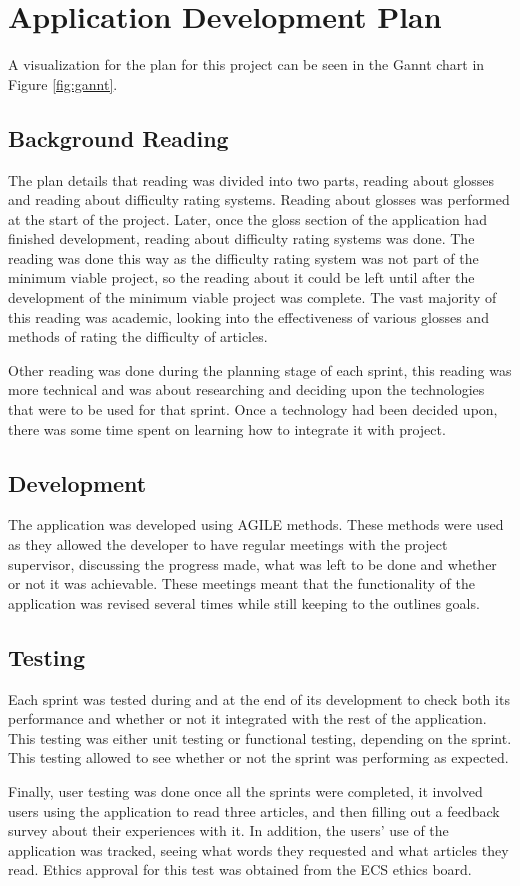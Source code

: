 \chapter{Application Development Plan}

A visualization for the plan for this project can be seen in the Gannt chart in Figure \ref{fig:gannt}.
 

\section{Background Reading}

The plan details that reading was divided into two parts, reading about glosses and reading about difficulty rating systems. Reading about glosses was performed at the start of the project. Later, once the gloss section of the application had finished development, reading about difficulty rating systems was done. The reading was done this way as the difficulty rating system was not part of the minimum viable project, so the reading about it could be left until after the development of the minimum viable project was complete. The vast majority of this reading was academic, looking into the effectiveness of various glosses and methods of rating the difficulty of articles.

Other reading was done during the planning stage of each sprint, this reading was more technical and was about researching and deciding upon the technologies that were to be used for that sprint. Once a technology had been decided upon, there was some time spent on learning how to integrate it with project.


\section{Development}

The application was developed using AGILE methods. These methods were used as they allowed the developer to have regular meetings with the project supervisor, discussing the progress made, what was left to be done and whether or not it was achievable. These meetings meant that the functionality of the application was revised several times while still keeping to the outlines goals. 

\section{Testing}

Each sprint was tested during and at the end of its development to check both its performance and whether or not it integrated with the rest of the application. This testing was either unit testing or functional testing, depending on the sprint. This testing allowed to see whether or not the sprint was performing as expected.

Finally, user testing was done once all the sprints were completed, it involved users using the application to read three articles, and then filling out a feedback survey about their experiences with it. In addition, the users' use of the application was tracked, seeing what words they requested and what articles they read. Ethics approval for this test was obtained from the ECS ethics board. 